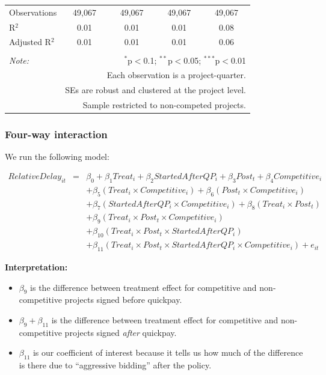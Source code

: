 \documentclass[
]{article}
\providecommand{\tightlist}{%
  \setlength{\itemsep}{0pt}\setlength{\parskip}{0pt}}
\begin{document}
\begin{table}[H]
\begin{tabular}{@{\extracolsep{-2pt}}lcccc}
Observations & 49,067 & 49,067 & 49,067 & 49,067 \\ 
R$^{2}$ & 0.01 & 0.01 & 0.01 & 0.08 \\ 
Adjusted R$^{2}$ & 0.01 & 0.01 & 0.01 & 0.06 \\ 
\hline 
\hline \\[-1.8ex] 
\textit{Note:}  & \multicolumn{4}{r}{$^{*}$p$<$0.1; $^{**}$p$<$0.05; $^{***}$p$<$0.01} \\ 
 & \multicolumn{4}{r}{Each observation is a project-quarter.} \\ 
 & \multicolumn{4}{r}{SEs are robust and clustered at the project level.} \\ 
 & \multicolumn{4}{r}{Sample restricted to non-competed projects.} \\ 
\end{tabular} 
\end{table}

\hypertarget{four-way-interaction}{%
\subsubsection{Four-way interaction}\label{four-way-interaction}}

We run the following model:

\[\begin{aligned} RelativeDelay_{it} &=& \beta_0 +\beta_1 Treat_i+ \beta_2 StartedAfterQP_i+ \beta_3 Post_t+ \beta_4 Competitive_i\\ && +  \beta_5 (Treat_i \times Competitive_i) + \beta_6 (Post_t \times Competitive_i)\\ && +  \beta_7 (StartedAfterQP_i \times Competitive_i) +\beta_8 (Treat_i \times Post_t)\\ && + \beta_9 (Treat_i \times Post_t \times Competitive_i) \\ && + \beta_{10} (Treat_i \times Post_t \times StartedAfterQP_i )\\ && + \beta_{11} (Treat_i \times Post_t \times StartedAfterQP_i \times Competitive_i) + e_{it} \end{aligned}\]

\textbf{Interpretation:}

\begin{itemize}
\tightlist
\item
  \(\beta_9\) is the difference between treatment effect for competitive
  and non-competitive projects signed before quickpay.
\item
  \(\beta_9 + \beta_{11}\) is the difference between treatment effect
  for competitive and non-competitive projects signed \emph{after}
  quickpay.
\item
  \(\beta_{11}\) is our coefficient of interest because it tells us how
  much of the difference is there due to ``aggressive bidding'' after
  the policy.
\end{itemize}
\end{document}

